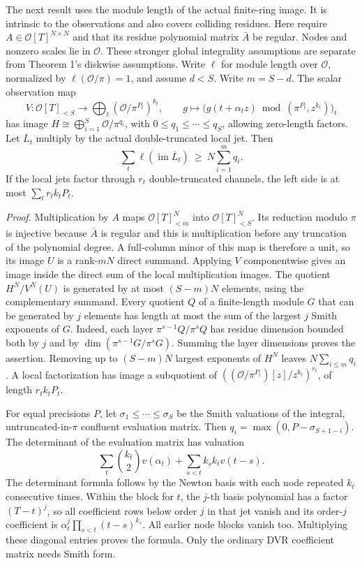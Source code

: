 \documentclass[
  11pt,
]{article}
\begin{document}
The next result uses the module length of the actual finite-ring image.
It is intrinsic to the observations and also covers colliding residues.
Here require \(A\in\mathcal O[T]^{N\times N}\) and that its residue
polynomial matrix \(\bar A\) be regular. Nodes and nonzero scales lie in
\(\mathcal O\). These stronger global integrality assumptions are
separate from Theorem 1's diskwise assumptions. Write \(\ell\) for
module length over \(\mathcal O\), normalized by
\(\ell(\mathcal O/\pi)=1\), and assume \(d<S\). Write \(m=S-d\). The
scalar observation map \[
 V:\mathcal O[T]_{<S}\longrightarrow\bigoplus_t(\mathcal O/\pi^{P_t})^{k_t},\qquad
 g\longmapsto \big(g(t+\alpha_t z)\bmod (\pi^{P_t},z^{k_t})\big)_t
\] has image \(H\cong\bigoplus_{i=1}^S\mathcal O/\pi^{q_i}\), with
\(0\le q_1\le\cdots\le q_S\), allowing zero-length factors. Let
\(\overline L_t\) multiply by the actual double-truncated local jet.
Then \[
             \sum_t\ell(\operatorname{im}\overline L_t)\ \ge\ N\sum_{i=1}^{m} q_i. \tag{A.10}
\] If the local jets factor through \(r_t\) double-truncated channels,
the left side is at most \(\sum_t r_t k_t P_t\).

\emph{Proof.} Multiplication by \(A\) maps \(\mathcal O[T]^N_{<m}\) into
\(\mathcal O[T]^N_{<S}\). Its reduction modulo \(\pi\) is injective
because \(\bar A\) is regular and this is multiplication before any
truncation of the polynomial degree. A full-column minor of this map is
therefore a unit, so its image \(U\) is a rank-\(mN\) direct summand.
Applying \(V\) componentwise gives an image inside the direct sum of the
local multiplication images. The quotient \(H^N/V^N(U)\) is generated by
at most \((S-m)N\) elements, using the complementary summand. Every
quotient \(Q\) of a finite-length module \(G\) that can be generated by
\(j\) elements has length at most the sum of the largest \(j\) Smith
exponents of \(G\). Indeed, each layer \(\pi^{s-1}Q/\pi^sQ\) has residue
dimension bounded both by \(j\) and by \(\dim(\pi^{s-1}G/\pi^sG)\).
Summing the layer dimensions proves the assertion. Removing up to
\((S-m)N\) largest exponents of \(H^N\) leaves \(N\sum_{i\le m}q_i\). A
local factorization has image a subquotient of
\(((\mathcal O/\pi^{P_t})[z]/z^{k_t})^{r_t}\), of length \(r_t k_tP_t\).

For equal precisions \(P\), let \(\sigma_1\le\cdots\le\sigma_S\) be the
Smith valuations of the integral, untruncated-in-\(\pi\) confluent
evaluation matrix. Then \(q_i=\max(0,P-\sigma_{S+1-i})\). The
determinant of the evaluation matrix has valuation \[
 \sum_t \binom{k_t}{2}v(\alpha_t)+\sum_{s<t}k_sk_t v(t-s).
\] The determinant formula follows by the Newton basis with each node
repeated \(k_t\) consecutive times. Within the block for \(t\), the
\(j\)-th basis polynomial has a factor \((T-t)^j\), so all coefficient
rows below order \(j\) in that jet vanish and its order-\(j\)
coefficient is \(\alpha_t^j\prod_{s<t}(t-s)^{k_s}\). All earlier node
blocks vanish too. Multiplying these diagonal entries proves the
formula. Only the ordinary DVR coefficient matrix needs Smith form.
\end{document}
